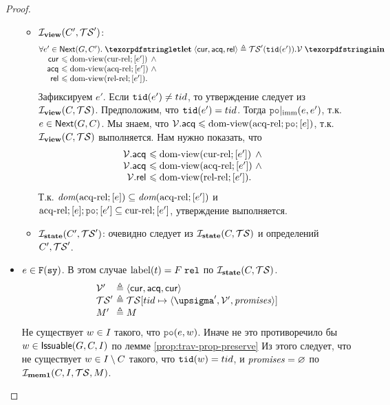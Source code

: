 \begin{proof}
\begin{itemize}
\begin{itemize}
        \item $\mathcal{I}_{\rm \bf view}(C', \mathcal{TS}')$:
          \[\inarr{
  \forall e' \in \nextset(G, C'). \; \letdef{\tup{\viewCur, \viewAcq, \viewfRel}}{\TSf'(\lTID(e')).\View}\\
  \quad
  \begin{array}{@{}r@{~}l@{~}l}
    \viewCur  & \le \domView(\curRel; [e']) & \land {} \\
    \viewAcq  & \le \domView(\acqRel; [e']) & \land {} \\
    \viewfRel & \le \domView(\relRel; [e']). \\
  \end{array}
          }\]
          Зафиксируем $e'$. Если ${\mathtt{tid}}(e') \neq tid$, то утверждение следует из $\mathcal{I}_{\rm \bf view}(C, \mathcal{TS})$.
          Предположим, что ${\mathtt{tid}}(e') = tid$. Тогда $\imm{\lPO}(e, e')$, т.к. $e \in {\sf Next}(G, C)$.
          Мы знаем, что $\View.\viewAcq \le \domView(\acqRel; \lPO; [e])$, т.к. $\mathcal{I}_{\rm \bf view}(C, \mathcal{TS})$ выполняется.
          Нам нужно показать, что
          \[\inarr{
  \begin{array}{@{}r@{~}l@{~}l}
    \View.\viewAcq  & \le \domView(\curRel; [e']) & \land {} \\
    \View.\viewAcq  & \le \domView(\acqRel; [e']) & \land {} \\
    \View.\viewfRel & \le \domView(\relRel; [e']). \\
  \end{array}
          }\]
          Т.к. $\textit{dom}{({{\rm acq\text{-}rel}; [e]})} \subseteq \textit{dom}{({{\rm acq\text{-}rel}; [e']})}$
          и $\acqRel;[e];\lPO;[e'] \suq \curRel; [e']$, утверждение выполняется.
        \item $\mathcal{I}_{\rm \bf state}(C', \mathcal{TS}')$:
          очевидно следует из $\mathcal{I}_{\rm \bf state}(C, \mathcal{TS})$ и определений $C', \mathcal{TS}'$.
      \end{itemize}

        \item $e \in {{\mathtt{F}}}(\mathtt{sy})$. В этом случае ${\rm label}(t) = F \; {\mathtt{rel}}$ по $\mathcal{I}_{\rm \bf state}(C, \mathcal{TS})$.
          \[\begin{array}{l@{~}l}
            \View'   & \defeq \tup{\viewCur, \viewAcq, \viewCur} \\
            \TSf'    & \defeq \TSf[tid \mapsto \tup{\pstate', \View', \PromSet}] \\
            M' & \defeq M \\
          \end{array}\]
          Не существует $w \in I$ такого, что $\lPO(e, w)$. Иначе не
          это противоречило бы $w \in {\sf Issuable}(G, C, I)$ по лемме \ref{prop:trav-prop-preserve} 
          Из этого следует, что не существует $w \in I \setminus C$ такого, что ${\mathtt{tid}}(w) = tid$, и
          $\mathit{promises} = \varnothing$ по $\mathcal{I}_{\rm \bf mem1}(C, I, \mathcal{TS}, M)$.
          

\end{itemize}
\end{proof}
